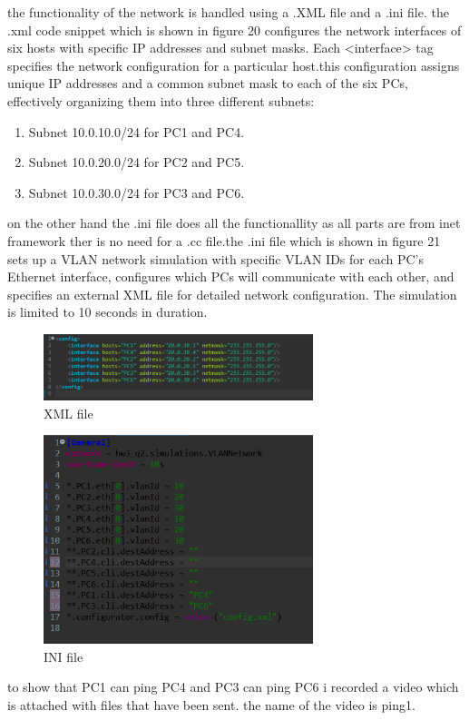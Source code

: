 \begin{qsolve}
\begin{qsolve}[]
        the functionality of the network is handled using a .XML file and a .ini file. the .xml code snippet which is shown in figure 20 configures the network interfaces of six hosts  with specific IP addresses and subnet masks. Each <interface> tag specifies the network configuration for a particular host.this configuration assigns unique IP addresses and a common subnet mask to each of the six PCs, effectively organizing them into three different subnets:
        \begin{enumerate}
            \item Subnet 10.0.10.0/24 for PC1 and PC4.
            \item Subnet 10.0.20.0/24 for PC2 and PC5.
            \item Subnet 10.0.30.0/24 for PC3 and PC6.
        \end{enumerate}
        \splitqsolve[\splitqsolve]
        on the other hand the .ini file does all the functionallity as all parts are from inet framework ther is no need for a .cc file.the .ini file which is shown in figure 21 sets up a VLAN network simulation with specific VLAN IDs for each PC's Ethernet interface, configures which PCs will communicate with each other, and specifies an external XML file for detailed network configuration. The simulation is limited to 10 seconds in duration.
        \begin{figure}[H]
            \centering
            \includegraphics[width=0.7\textwidth]{Q2_1xml.png}
            \caption{XML file}
        \end{figure}
        \begin{figure}[H]
            \centering
            \includegraphics[width=0.7\textwidth]{Q2_1ini.png}
            \caption{INI file}
        \end{figure}
        to show that PC1 can ping PC4 and PC3 can ping PC6 i recorded a video which is attached with files that have been sent. the name of the video is ping1.
    \end{qsolve}
\end{qsolve}
